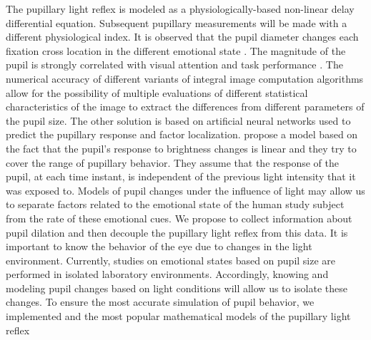 \documentclass[USenglish,twocolumn]{article}
\begin{document}
The pupillary light reflex is modeled as a physiologically-based non-linear delay differential equation. 
Subsequent pupillary measurements will be made with a different physiological index. It is observed that the pupil diameter changes each fixation cross location in the different emotional state \cite{Raiturkar}. The magnitude of the pupil is strongly correlated with visual attention and task performance \cite{Ebitz}. The numerical accuracy of different variants of integral image computation algorithms allow for the possibility of multiple evaluations of different statistical characteristics of the image \cite{Puchala} to extract the differences from different parameters of the pupil size. 
The other solution is based on artificial neural networks \cite{Garbaa} \cite{Lipinski} used to predict the pupillary response and factor localization. 
\cite{Raiturkar} propose a model based on the fact that the pupil’s response to brightness changes is linear and they try to cover the range of pupillary behavior. They assume that the response of the pupil, at each time instant, is independent of the previous light intensity that it was exposed to.
Models of pupil changes under the influence of light may allow us to separate factors related to the emotional state of the human study subject from the rate of these emotional cues. We propose to collect information about pupil dilation and then decouple the pupillary light reflex from this data. It is important to know the behavior of the eye due to changes in the light environment. Currently, studies on emotional states based on pupil size are performed in isolated laboratory environments. Accordingly, knowing and modeling pupil changes based on light conditions will allow us to isolate these changes. To ensure the most accurate simulation of pupil behavior, we implemented and the most popular mathematical models of the pupillary light reflex
\end{document}
